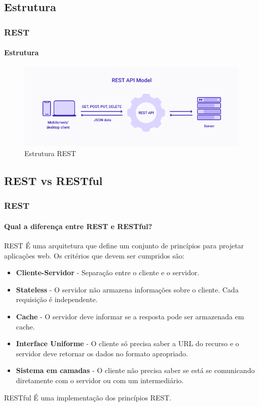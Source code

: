 \documentclass[
	9pt, %
	t, %
]{beamer}
\begin{document}
\subsection{Estrutura}

\begin{frame}
	\frametitle{REST}
	\framesubtitle{Estrutura}

	\begin{figure}
		\includegraphics[width=0.9\linewidth]{rest_estrutura.png}
		\caption{Estrutura REST}
		\label{fig:rest_structure}
	\end{figure}

\end{frame}

\subsection{REST vs RESTful}

\begin{frame}
	\frametitle{REST}
	\framesubtitle{Qual a diferença entre REST e RESTful?}

	\begin{block}{REST}
		É uma \alert{arquitetura} que define um conjunto de princípios para projetar aplicações web.
		Os critérios que devem ser cumpridos são:
		\begin{itemize}
			\item \textbf{Cliente-Servidor} - Separação entre o cliente e o servidor.
			\item \textbf{Stateless} - O servidor não armazena informações sobre o cliente. Cada requisição é independente.
			\item \textbf{Cache} - O servidor deve informar se a resposta pode ser armazenada em cache.
			\item \textbf{Interface Uniforme} - O cliente só precisa saber a URL do recurso e o servidor deve retornar os dados no formato apropriado.
			\item \textbf{Sistema em camadas} - O cliente não precisa saber se está se comunicando diretamente com o servidor ou com um intermediário.
		\end{itemize}
	
	\end{block}

	\begin{block}{RESTful}
		É uma \alert{implementação} dos princípios REST.
	\end{block}
	
\end{frame}
\end{document}
